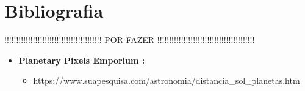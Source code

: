 \documentclass[a4paper]{article}
\begin{document}
\section{Bibliografia}
\label{sec:bibliografia}

!!!!!!!!!!!!!!!!!!!!!!!!!!!!!!!!!!!!!!!!! POR FAZER !!!!!!!!!!!!!!!!!!!!!!!!!!!!!!!!!!!!!!!!!

\begin{itemize}

  \item \textbf{Planetary Pixels Emporium :}
  \begin{itemize}
    \item https://www.suapesquisa.com/astronomia/distancia\_sol\_planetas.htm
  \end{itemize}

\end{itemize}
\end{document}
